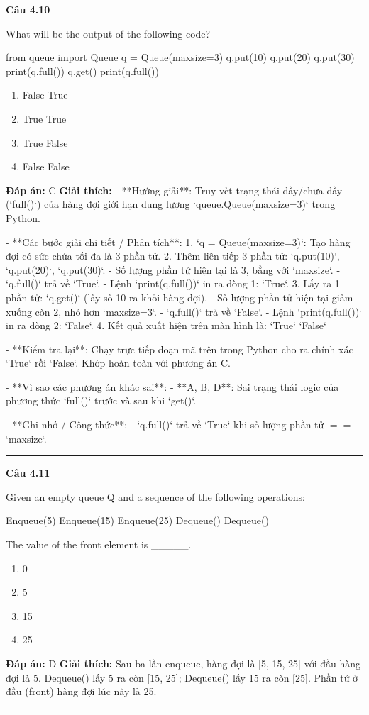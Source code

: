 \documentclass[11pt,a4paper]{article}
\newenvironment{question}[1]{%
  \par\vspace{1em}\noindent\textbf{\large Câu #1}\par\vspace{0.4em}
}{%
  \par\vspace{1em}\hrule\vspace{0.6em}
}
\newenvironment{choices}{%
  \begin{enumerate}[label=\textbf{\Alph*.},leftmargin=2.2em,itemsep=2pt,topsep=3pt]
}{%
  \end{enumerate}
}
\newcommand{\choice}{\item}
\newenvironment{codebox}{%
  \begin{tcolorbox}[colback=gray!8!white,colframe=gray!50!black,arc=1.5mm,boxrule=0.6pt,left=3mm,right=3mm,top=2.5mm,bottom=2.5mm]
  \ttfamily\small
}{%
  \end{tcolorbox}
}
\begin{document}
\begin{question}{4.10}
What will be the output of the following code?
\begin{codebox}
from queue import Queue
q = Queue(maxsize=3)
q.put(10)
q.put(20)
q.put(30)
print(q.full())
q.get()
print(q.full())
\end{codebox}
\begin{choices}
\choice False
True
\choice True
True
\choice True
False
\choice False
False
\end{choices}
\textbf{Đáp án:} C
\textbf{Giải thích:} - **Hướng giải**:
  Truy vết trạng thái đầy/chưa đầy (`full()`) của hàng đợi giới hạn dung lượng `queue.Queue(maxsize=3)` trong Python.

- **Các bước giải chi tiết / Phân tích**:
  1. `q = Queue(maxsize=3)`: Tạo hàng đợi có sức chứa tối đa là 3 phần tử.
  2. Thêm liên tiếp 3 phần tử: `q.put(10)`, `q.put(20)`, `q.put(30)`.
     - Số lượng phần tử hiện tại là 3, bằng với `maxsize`.
     - `q.full()` trả về `True`.
     - Lệnh `print(q.full())` in ra dòng 1: `True`.
  3. Lấy ra 1 phần tử: `q.get()` (lấy số 10 ra khỏi hàng đợi).
     - Số lượng phần tử hiện tại giảm xuống còn 2, nhỏ hơn `maxsize=3`.
     - `q.full()` trả về `False`.
     - Lệnh `print(q.full())` in ra dòng 2: `False`.
  4. Kết quả xuất hiện trên màn hình là:
     `True`
     `False`

- **Kiểm tra lại**:
  Chạy trực tiếp đoạn mã trên trong Python cho ra chính xác `True` rồi `False`.
  Khớp hoàn toàn với phương án C.

- **Vì sao các phương án khác sai**:
  - **A, B, D**: Sai trạng thái logic của phương thức `full()` trước và sau khi `get()`.

- **Ghi nhớ / Công thức**:
  - `q.full()` trả về `True` khi số lượng phần tử \(==\) `maxsize`.
\end{question}

\begin{question}{4.11}
Given an empty queue Q and a sequence of the following operations:
\begin{codebox}
Enqueue(5)
Enqueue(15)
Enqueue(25)
Dequeue()
Dequeue()
\end{codebox}
The value of the front element is _____.
\begin{choices}
\choice 0
\choice 5
\choice 15
\choice 25
\end{choices}
\textbf{Đáp án:} D
\textbf{Giải thích:} Sau ba lần enqueue, hàng đợi là [5, 15, 25] với đầu hàng đợi là 5. Dequeue() lấy 5 ra còn [15, 25]; Dequeue() lấy 15 ra còn [25]. Phần tử ở đầu (front) hàng đợi lúc này là 25.
\end{question}
\end{document}
